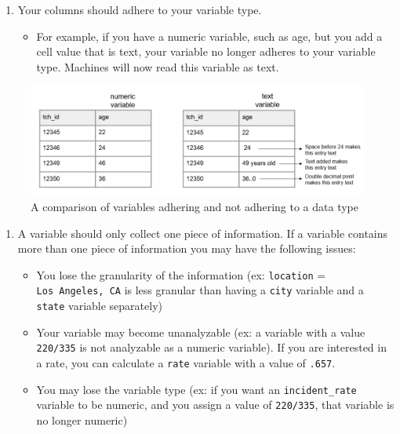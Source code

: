 \documentclass[
]{book}
\providecommand{\tightlist}{%
  \setlength{\itemsep}{0pt}\setlength{\parskip}{0pt}}
\begin{document}
\begin{enumerate}
\def\labelenumi{\arabic{enumi}.}
\setcounter{enumi}{1}
\tightlist
\item
  Your columns should adhere to your variable type.

  \begin{itemize}
  \tightlist
  \item
    For example, if you have a numeric variable, such as age, but you add a cell value that is text, your variable no longer adheres to your variable type. Machines will now read this variable as text.
  \end{itemize}
\end{enumerate}

\begin{figure}

{\centering \includegraphics[width=1\linewidth]{img/var_type} 

}

\caption{A comparison of variables adhering and not adhering to a data type}\label{fig:unnamed-chunk-4}
\end{figure}

\begin{enumerate}
\def\labelenumi{\arabic{enumi}.}
\setcounter{enumi}{2}
\tightlist
\item
  A variable should only collect one piece of information. If a variable contains more than one piece of information you may have the following issues:

  \begin{itemize}
  \tightlist
  \item
    You lose the granularity of the information (ex: \texttt{location} = \texttt{Los\ Angeles,\ CA} is less granular than having a \texttt{city} variable and a \texttt{state} variable separately)
  \item
    Your variable may become unanalyzable (ex: a variable with a value \texttt{220/335} is not analyzable as a numeric variable). If you are interested in a rate, you can calculate a \texttt{rate} variable with a value of \texttt{.657}.
  \item
    You may lose the variable type (ex: if you want an \texttt{incident\_rate} variable to be numeric, and you assign a value of \texttt{220/335}, that variable is no longer numeric)
  \end{itemize}
\end{enumerate}
\end{document}
